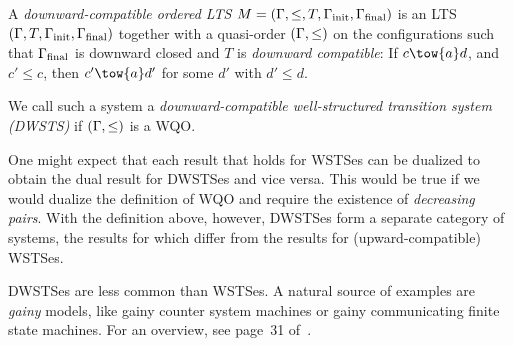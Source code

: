 \documentclass[../../diss.tex]{subfiles}
\begin{document}
A \emph{downward-compatible ordered LTS} $M = (\Gamma,\leq,T,\Gamma_{\text{init}},\Gamma_{\text{final}})$ is an LTS $(\Gamma,T,\Gamma_{\text{init}},\Gamma_{\text{final}})$ together with a quasi-order $(\Gamma,\leq)$ on the configurations such that $\Gamma_{\text{final}}$ is downward closed and $T$ is \emph{downward compatible}: If $c \tow{a} d$, and $c' \leq c$, then $c' \tow{a} d'$ for some $d'$ with $d' \leq d$.

We call such a system a \emph{downward-compatible well-structured transition system (DWSTS)} if $(\Gamma,\leq)$ is a WQO.\@

One might expect that each result that holds for WSTSes can be dualized to obtain the dual result for DWSTSes and vice versa.
This would be true if we would dualize the definition of WQO and require the existence of \emph{decreasing pairs}.
With the definition above, however, DWSTSes form a separate category of systems, the results for which differ from the results for (upward-compatible) WSTSes.

DWSTSes are less common than WSTSes.
A natural source of examples are \emph{gainy} models,
like gainy counter system machines or gainy communicating finite state machines.
For an overview, see page~31 of~\cite{FinkelS01}.
\end{document}
